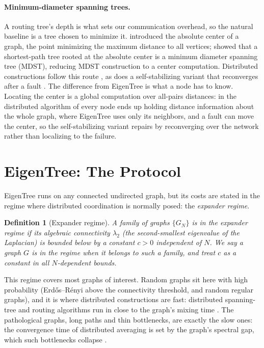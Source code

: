 \documentclass[letterpaper]{article} %
\newtheorem{definition}{Definition}
\begin{document}
\paragraph{Minimum-diameter spanning trees.} A routing tree's depth is what
sets our communication overhead, so the natural baseline is a tree chosen to
minimize it. \cite{hakimi1964} introduced the absolute center of a graph, the
point minimizing the maximum distance to all vertices; \cite{hassintamir1995}
showed that a shortest-path tree rooted at the absolute center is a minimum
diameter spanning tree (MDST), reducing MDST construction to a center
computation. Distributed constructions follow this route
\citep{bui2004distributed}, as does a self-stabilizing variant that reconverges
after a fault \citep{butelle1995selfstabilizing}. The difference from EigenTree
is what a node has to know. Locating the center is a global computation over
all-pairs distances: in the distributed algorithm of \cite{bui2004distributed}
every node ends up holding distance information about the whole graph, where
EigenTree uses only its neighbors, and a fault can move the center, so the
self-stabilizing variant repairs by reconverging over the network rather than
localizing to the failure.

\section{EigenTree: The Protocol}

EigenTree runs on any connected undirected graph, but its costs are stated in the
regime where distributed coordination is normally posed: the \emph{expander
regime}.

\begin{definition}[Expander regime]
\label{def:expander}
A family of graphs $\{G_N\}$ is in the expander regime if its algebraic
connectivity $\lambda_2$ (the second-smallest eigenvalue of the Laplacian) is
bounded below by a constant $c > 0$ independent of $N$. We say a graph $G$ is in
the regime when it belongs to such a family, and treat $c$ as a constant in all
$N$-dependent bounds.
\end{definition}

This regime covers most graphs of interest. Random graphs sit here with high
probability (Erd\H{o}s--R\'{e}nyi above the connectivity threshold, and random
regular graphs), and it is where distributed constructions are fast: distributed
spanning-tree and routing algorithms run in close to the graph's mixing time
\citep{ghaffari2017distributed}. The pathological graphs, long paths and thin
bottlenecks, are exactly the slow ones: the convergence time of distributed
averaging is set by the graph's spectral gap, which such bottlenecks collapse
\citep{boyd2006randomized}.
\end{document}
